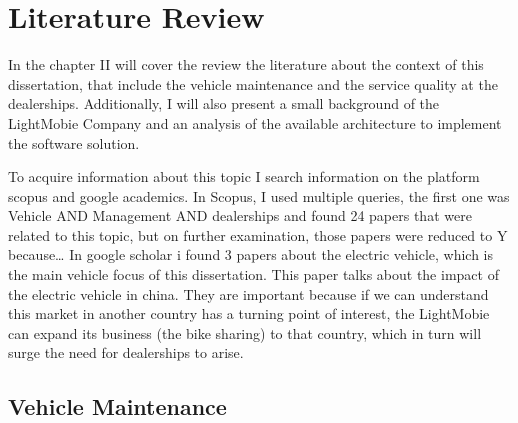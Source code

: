 \chapter{Literature Review}%
\label{chapter:literatureReview}

\begin{introduction}
In the chapter II will cover the review the literature about the context of this dissertation, that include the vehicle maintenance and the service quality at the dealerships. 
Additionally, I will also present a small background of the LightMobie Company and an analysis of the available architecture to implement the software solution.
\end{introduction} 


To acquire information about this topic I search information on the platform scopus and google academics. 
In Scopus, I used multiple queries, the first one was Vehicle AND Management AND dealerships and found 24 papers that were related to this topic, but on further examination, those papers were reduced to Y because… 
In google scholar i found 3 papers about the electric vehicle, which is the main vehicle focus of this dissertation. 
This paper talks about the impact of the electric vehicle in china. 
They are important because if we can understand this market in another country has a turning point of interest, the LightMobie can expand its business (the bike sharing) to that country, which in turn will surge the need for dealerships to arise.  




\section{Vehicle Maintenance}

